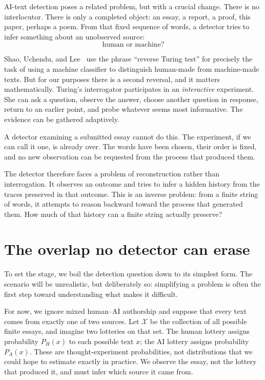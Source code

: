\documentclass[pdflatex,sn-mathphys-num]{sn-jnl}
\begin{document}
AI-text detection poses a related problem, but with a crucial change. There is no interlocutor. There is only a completed object: an essay, a report, a proof, 
this paper, perhaps a poem. From that fixed sequence of words, a detector tries to infer something about an unobserved source:
\[
\text{human or machine?}
\]

Shao, Uchendu, and Lee~\cite{Shao2019} use the phrase ``reverse Turing test'' for precisely the task of using a machine classifier to distinguish human-made 
from machine-made texts. But for our purposes there is a second reversal, and it matters mathematically. Turing's interrogator participates in an 
\emph{interactive} experiment. She can ask a question, observe the answer, choose another question in response, return to an earlier point, and probe 
whatever seems most informative. The evidence can be gathered adaptively.

A detector examining a submitted essay cannot do this. The experiment, if we can call it one, is already over. The words have been chosen, their order is 
fixed, and no new observation can be requested from the process that produced them.

The detector therefore faces a problem of reconstruction rather than interrogation. It observes an outcome and tries to infer a hidden history from the 
traces preserved in that outcome. This is an inverse problem: from a finite string of words, it attempts to reason backward toward the process that 
generated them. How much of that history can a finite string actually preserve?

\section*{The overlap no detector can erase}
To set the stage, we boil the detection question down to its simplest form. The scenario will be unrealistic, but deliberately so: simplifying a problem 
is often the first step toward understanding what makes it difficult.

For now, we ignore mixed human--AI authorship and suppose that every text comes from exactly one of two sources. Let \(\mathcal X\) be the collection 
of all possible finite essays, and imagine two lotteries on that set. The human lottery assigns probability \(P_H(x)\) to each possible text \(x\); the AI lottery 
assigns probability \(P_A(x)\). These are thought-experiment probabilities, not distributions that we could hope to estimate exactly in practice. We observe 
the essay, not the lottery that produced it, and must infer which source it came from.
\end{document}

